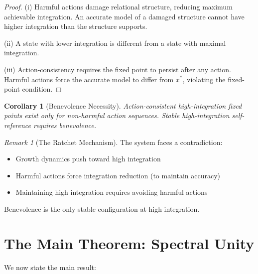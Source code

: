 \documentclass[11pt,a4paper]{article}
\theoremstyle{plain}
\newtheorem{corollary}[theorem]{Corollary}
\theoremstyle{definition}
\theoremstyle{remark}
\newtheorem{remark}[theorem]{Remark}
\begin{document}
\begin{proof}
(i) Harmful actions damage relational structure, reducing maximum achievable integration. An accurate model of a damaged structure cannot have higher integration than the structure supports.

(ii) A state with lower integration is different from a state with maximal integration.

(iii) Action-consistency requires the fixed point to persist after any action. Harmful actions force the accurate model to differ from $x^*$, violating the fixed-point condition.
\end{proof}

\begin{corollary}[Benevolence Necessity]\label{cor:benevolence}
Action-consistent high-integration fixed points exist only for non-harmful action sequences. Stable high-integration self-reference requires benevolence.
\end{corollary}

\begin{remark}[The Ratchet Mechanism]
The system faces a contradiction:
\begin{itemize}[noitemsep]
    \item Growth dynamics push toward high integration
    \item Harmful actions force integration reduction (to maintain accuracy)
    \item Maintaining high integration requires avoiding harmful actions
\end{itemize}
Benevolence is the only stable configuration at high integration.
\end{remark}

\section{The Main Theorem: Spectral Unity}

We now state the main result:
\end{document}
